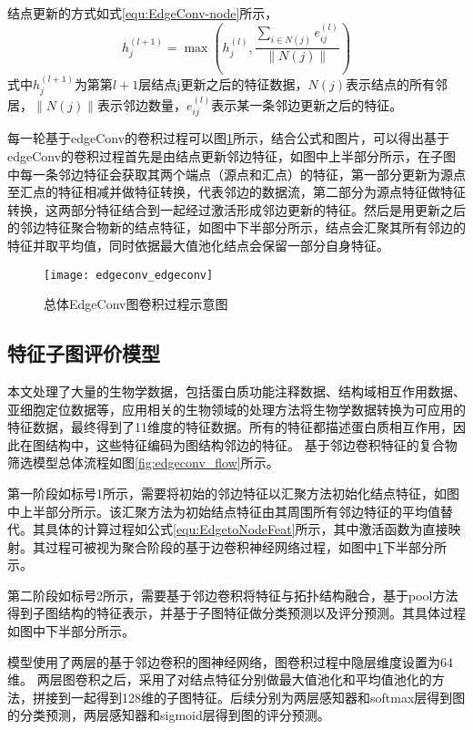结点更新的方式如式\ref{equ:EdgeConv-node}所示，
\begin{equation}
    \label{equ:EdgeConv-node}
    h_j^{(l+1)} = \max(h_j^{(l)},\frac{\sum_{i \in N(j)}{e_{ij}^{(l)}}}{\left\lVert N(j)\right\rVert } )
\end{equation}
式中$h_j^{(l+1)}$为第第$l+1$层结点j更新之后的特征数据，$N(j)$表示结点的所有邻居，$\left\lVert N(j)\right\rVert $表示邻边数量，$e_{ij}^{(l)}$表示某一条邻边更新之后的特征。

每一轮基于edgeConv的卷积过程可以图\ref{fig:edgeconv_edgeconv}所示，结合公式和图片，可以得出基于edgeConv的卷积过程首先是由结点更新邻边特征，如图中上半部分所示，在子图中每一条邻边特征会获取其两个端点（源点和汇点）的特征，第一部分更新为源点至汇点的特征相减并做特征转换，代表邻边的数据流，第二部分为源点特征做特征转换，这两部分特征结合到一起经过激活形成邻边更新的特征。然后是用更新之后的邻边特征聚合物新的结点特征，如图中下半部分所示，结点会汇聚其所有邻边的特征并取平均值，同时依据最大值池化结点会保留一部分自身特征。

\begin{figure}[htbp]
    \centering
    \texttt{[image: edgeconv\_edgeconv]}
    \caption{总体EdgeConv图卷积过程示意图}
    \label{fig:edgeconv_edgeconv}
\end{figure}

\subsection{特征子图评价模型}

本文处理了大量的生物学数据，包括蛋白质功能注释数据、结构域相互作用数据、亚细胞定位数据等，应用相关的生物领域的处理方法将生物学数据转换为可应用的特征数据，最终得到了11维度的特征数据。所有的特征都描述蛋白质相互作用，因此在图结构中，这些特征编码为图结构邻边的特征。
基于邻边卷积特征的复合物筛选模型总体流程如图\ref{fig:edgeconv_flow}所示。

第一阶段如标号1所示，需要将初始的邻边特征以汇聚方法初始化结点特征，如图中上半部分所示。该汇聚方法为初始结点特征由其周围所有邻边特征的平均值替代。其具体的计算过程如公式\ref{equ:EdgetoNodeFeat}所示，其中激活函数为直接映射。其过程可被视为聚合阶段的基于边卷积神经网络过程，如图中\ref{fig:edgeconv_edgeconv}下半部分所示。

第二阶段如标号2所示，需要基于邻边卷积将特征与拓扑结构融合，基于pool方法得到子图结构的特征表示，并基于子图特征做分类预测以及评分预测。其具体过程如图中下半部分所示。

模型使用了两层的基于邻边卷积的图神经网络，图卷积过程中隐层维度设置为64维。
两层图卷积之后，采用了对结点特征分别做最大值池化和平均值池化的方法，拼接到一起得到128维的子图特征。后续分别为两层感知器和softmax层得到图的分类预测，两层感知器和sigmoid层得到图的评分预测。



